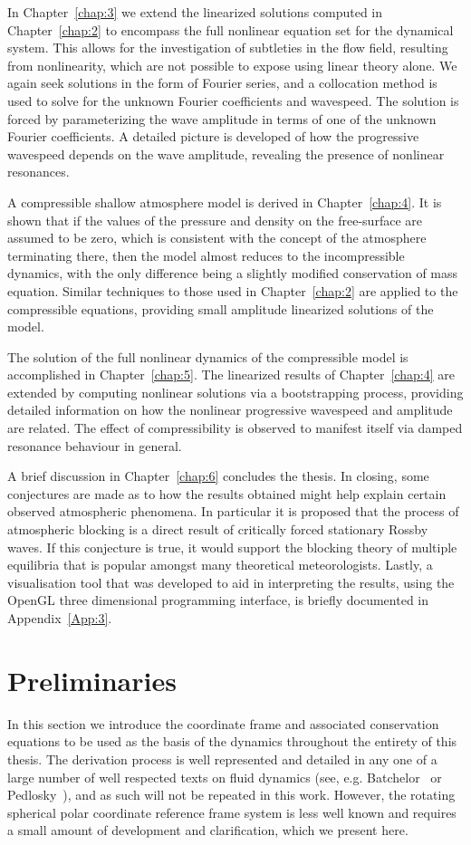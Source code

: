 In Chapter~\ref{chap:3} we extend the linearized solutions computed in Chapter~\ref{chap:2} to encompass the full nonlinear equation set for the dynamical system. This allows for the investigation of subtleties in the flow field, resulting from nonlinearity, which are not possible to expose using linear theory alone. We again seek solutions in the form of Fourier series, and a collocation method is used to solve for the unknown Fourier coefficients and wavespeed. The solution is forced by parameterizing the wave amplitude in terms of one of the unknown Fourier coefficients. A detailed picture is developed of how the progressive wavespeed depends on the wave amplitude, revealing the presence of nonlinear resonances.

A compressible shallow atmosphere model is derived in Chapter~\ref{chap:4}. It is shown that if the values of the pressure and density on the free-surface are assumed to be zero, which is consistent with the concept of the atmosphere terminating there, then the model almost reduces to the incompressible dynamics, with the only difference being a slightly modified conservation of mass equation. Similar techniques to those used in Chapter~\ref{chap:2} are applied to the compressible equations, providing small amplitude linearized solutions of the model.

The solution of the full nonlinear dynamics of the compressible model is accomplished in Chapter~\ref{chap:5}. The linearized results of Chapter~\ref{chap:4} are extended by computing nonlinear solutions via a bootstrapping process, providing detailed information on how the nonlinear progressive wavespeed and amplitude are related. The effect of compressibility is observed to manifest itself via damped resonance behaviour in general. 

A brief discussion in Chapter~\ref{chap:6} concludes the thesis. In closing, some conjectures are made as to how the results obtained might help explain certain observed atmospheric phenomena. In particular it is proposed that the process of atmospheric blocking is a direct result of critically forced stationary Rossby waves. If this conjecture is true, it would support the blocking theory of multiple equilibria that is popular amongst many theoretical meteorologists. Lastly, a visualisation tool that was developed to aid in interpreting the results, using the OpenGL three dimensional programming interface, is briefly documented in Appendix~\ref{App:3}.

\section{Preliminaries}
In this section we introduce the coordinate frame and associated conservation equations to be used as the basis of the dynamics throughout the entirety of this thesis. The derivation process is well represented and detailed in any one of a large number of well respected texts on fluid dynamics (see, e.g. Batchelor~\cite{Batchelor:IFD} or Pedlosky~\cite{Pedlosky:GFD}), and as such will not be repeated in this work. However, the rotating spherical polar coordinate reference frame system is less well known and requires a small amount of development and clarification, which we present here.

